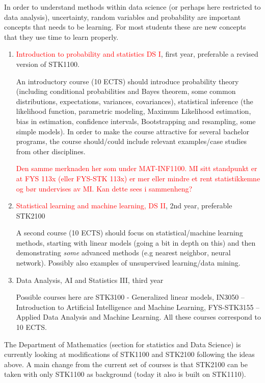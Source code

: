\documentclass[oneside,final,10pt]{article}
\begin{document}
 In order to understand methods within data science (or perhaps here restricted to data analysis), uncertainty, random variables and probability are important concepts that needs to be learning. For most students these are new concepts that they use time to learn properly. 
\begin{enumerate}
    \item \textcolor{red}{Introduction to probability and statistics DS I}, first year, preferable a revised version of STK1100.
    
    An introductory course (10 ECTS) should introduce probability theory (including conditional probabilities and Bayes theorem, some common distributions, expectations, variances, covariances), statistical inference (the likelihood function, parametric modeling, Maximum Likelihood estimation, bias in estimation, confidence intervals, Bootstrapping and resampling, some simple models). In order to make the course attractive for several bachelor programs, the course should/could include relevant examples/case studies from other disciplines.
    
    \textcolor{red}{Den samme merknaden her som under MAT-INF1100. MI sitt standpunkt er at FYS 113x (eller FYS-STK 113x) er mer eller mindre et rent statistikkemne og b\o{}r undervises av MI. Kan dette sees i sammenheng?}
    \item \textcolor{red}{Statistical learning and machine learning, DS II}, 2nd year, preferable STK2100
    
    A second course (10 ECTS) should focus on statistical/machine learning methods, starting with linear models (going a bit in depth on this) and then demonstrating \emph{some} advanced methods (e.g nearest neighbor, neural network). Possibly also examples of unsupervised learning/data mining.

    \item Data Analysis, AI and Statistics III, third year
    
    Possible courses here are STK3100 - Generalized linear models,  
IN3050 – Introduction to Artificial Intelligence and Machine Learning, FYS-STK3155 – Applied Data Analysis and Machine Learning. All these courses correspond to 10 ECTS.
\end{enumerate}


The Department of Mathematics
(section for statistics and Data Science) is currently looking at modifications of STK1100 and STK2100 following the ideas above. A main change from the current set of courses is that STK2100 can be taken with only STK1100 as background (today it also is built on STK1110).
\end{document}
